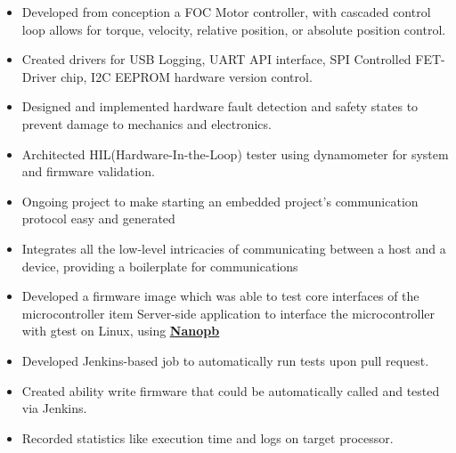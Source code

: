 \documentclass[10pt,a4paper,ragged2e,withhyper]{altacv}
\begin{document}
\begin{paracol}{2}
\begin{itemize}
\item Developed from conception a FOC Motor controller, with cascaded control loop allows for torque, velocity, relative position, or absolute position control.
\item Created drivers for USB Logging, UART API interface, SPI Controlled FET-Driver chip, I2C EEPROM hardware version control.
\item Designed and implemented hardware fault detection and safety states to prevent damage to mechanics and electronics.
\item Architected HIL(Hardware-In-the-Loop) tester using dynamometer for system and firmware validation.
\end{itemize}

\end{paracol}
\newpage


\begin{itemize}
\item Ongoing project to make starting an embedded project's communication protocol easy and generated
\item Integrates all the low-level intricacies of communicating between a host and a device, providing a boilerplate for communications
\end{itemize}

\divider

\begin{itemize}
\item Developed a firmware image which was able to test core interfaces of the microcontroller
item Server-side application to interface the microcontroller with gtest on Linux, using  \underline{\textbf{\href{https://github.com/nanopb/nanopb}{Nanopb}}}
\item Developed Jenkins-based job to automatically run tests upon pull request.
\item Created ability write firmware that could be automatically called and tested via Jenkins.
\item Recorded statistics like execution time and logs on target processor.
\end{itemize}

\divider
\end{document}
